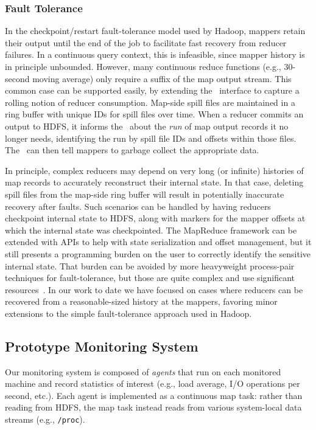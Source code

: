 \subsubsection{Fault Tolerance}
In the checkpoint/restart fault-tolerance model used by Hadoop, mappers retain
their output until the end of the job to facilitate fast recovery from reducer
failures. In a continuous query context, this is infeasible, since mapper
history is in principle unbounded.  However, many continuous reduce functions
(e.g., 30-second moving average) only require a suffix of the map output stream.
This common case can be supported easily, by extending the \JT\ interface to
capture a rolling notion of reducer consumption.  Map-side spill files are
maintained in a ring buffer with unique IDs for spill files over time. When a
reducer commits an output to HDFS, it informs the \JT\ about the {\em run} of
map output records it no longer needs, identifying the run by spill file IDs and
offsets within those files.  The \JT\ can then tell mappers to garbage collect
the appropriate data.

In principle, complex reducers may depend on very long (or infinite) histories of map records to accurately reconstruct their internal state.  In that case, deleting spill files
from the map-side ring buffer will result in potentially inaccurate recovery after faults.  Such scenarios can be handled by having reducers checkpoint internal state to HDFS, along with markers for the mapper offsets at which the internal state was checkpointed.  The MapReduce framework can be extended with APIs to help with state serialization and offset management, but it still presents a programming burden on the user to correctly identify the sensitive internal state.  That burden can be avoided by more heavyweight process-pair 
techniques for fault-tolerance, but those are quite complex and use significant resources~\cite{flux-ft}.  In our work to date we have focused on cases where reducers can be recovered from a reasonable-sized history at the mappers, favoring minor extensions to the simple fault-tolerance approach used in Hadoop.

\subsection{Prototype Monitoring System}
\label{ch:hop:sec:monitor}

Our monitoring system is composed of {\em agents} that run on each monitored
machine and record statistics of interest (e.g., load average, I/O operations
per second, etc.). Each agent is implemented as a continuous map task: rather
than reading from HDFS, the map task instead reads from various system-local
data streams (e.g., \texttt{/proc}).

